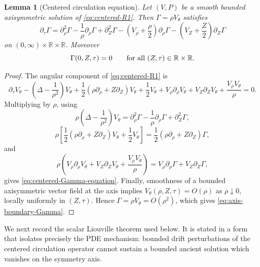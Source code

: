 \documentclass[11pt]{amsart}
\numberwithin{equation}{section}
\theoremstyle{plain}
\newtheorem{lemma}[theorem]{Lemma}
\theoremstyle{definition}
\theoremstyle{remark}
\begin{document}
\begin{lemma}[Centered circulation equation]\label{lem:centered-circulation-equation}
Let \((V,P)\) be a smooth bounded axisymmetric solution of
\eqref{eq:centered-R1}.  Then \(\Gamma=\rho V_\theta\) satisfies
\begin{equation}\label{eq:centered-Gamma-equation}
   \partial_\tau\Gamma
   =
   \partial_\rho^2\Gamma-\frac1\rho\partial_\rho\Gamma
      +\partial_Z^2\Gamma
   -\left(V_\rho+\frac\rho2\right)\partial_\rho\Gamma
   -\left(V_Z+\frac Z2\right)\partial_Z\Gamma
\end{equation}
on \((0,\infty)\times\mathbb R\times\mathbb R\).  Moreover
\begin{equation}\label{eq:axis-boundary-Gamma}
   \Gamma(0,Z,\tau)=0
   \qquad\hbox{for all }(Z,\tau)\in\mathbb R\times\mathbb R .
\end{equation}
\end{lemma}

\begin{proof}
The angular component of \eqref{eq:centered-R1} is
\[
   \partial_\tau V_\theta
   -\left(\Delta-\frac1{\rho^2}\right)V_\theta
   +\frac12(\rho\partial_\rho+Z\partial_Z)V_\theta
   +\frac12V_\theta
   +V_\rho\partial_\rho V_\theta+V_Z\partial_ZV_\theta
   +\frac{V_\rho V_\theta}{\rho}=0 .
\]
Multiplying by \(\rho\), using
\[
   \rho\left(\Delta-\frac1{\rho^2}\right)V_\theta
   =\partial_\rho^2\Gamma-\frac1\rho\partial_\rho\Gamma+
      \partial_Z^2\Gamma,
\]
\[
   \rho\left[\frac12(\rho\partial_\rho+Z\partial_Z)V_\theta
      +\frac12V_\theta\right]
   =\frac12(\rho\partial_\rho+Z\partial_Z)\Gamma,
\]
and
\[
   \rho\left(V_\rho\partial_\rho V_\theta+V_Z\partial_ZV_\theta
      +\frac{V_\rho V_\theta}{\rho}\right)
   =V_\rho\partial_\rho\Gamma+V_Z\partial_Z\Gamma,
\]
gives \eqref{eq:centered-Gamma-equation}.  Finally, smoothness of a bounded
axisymmetric vector field at the axis implies \(V_\theta(\rho,Z,\tau)=O(\rho)\)
as \(\rho\downarrow0\), locally uniformly in \((Z,\tau)\).  Hence
\(\Gamma=\rho V_\theta=O(\rho^2)\), which gives
\eqref{eq:axis-boundary-Gamma}.
\end{proof}

We next record the scalar Liouville theorem used below.  It is stated in a
form that isolates precisely the PDE mechanism: bounded drift perturbations of
the centered circulation operator cannot sustain a bounded ancient solution
which vanishes on the symmetry axis.
\end{document}
